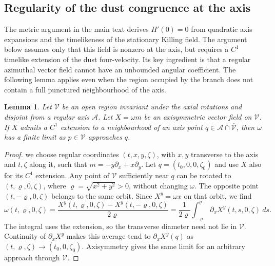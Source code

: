\documentclass[amsmath,amsfonts,amssymb,aps,pra,superscriptaddress,10pt]{revtex4-2}
\numberwithin{equation}{section}
\theoremstyle{plain}
\newtheorem{lemma}{Lemma}
\theoremstyle{definition}
\theoremstyle{remark}
\theoremstyle{definition}
\begin{document}
\subsection{Regularity of the dust congruence at the axis}

The metric argument in the main text derives $H'(0)=0$ from quadratic axis expansions and the timelikeness of the stationary Killing field. The argument below assumes only that this field is nonzero at the axis, but requires a $C^1$ timelike extension of the dust four-velocity. Its key ingredient is that a regular azimuthal vector field cannot have an unbounded angular coefficient. The following lemma applies even when the region occupied by the branch does not contain a full punctured neighbourhood of the axis.

\begin{lemma}\label{Smoothazcoeff}
Let $\mathcal{V}$ be an open region invariant under the axial rotations and disjoint from a regular axis $\mathcal{A}$. Let $X=\omega m$ be an axisymmetric vector field on $\mathcal{V}$. If $X$ admits a $C^1$ extension to a neighbourhood of an axis point $q\in\mathcal{A}\cap\overline{\mathcal{V}}$, then $\omega$ has a finite limit as $p\in\mathcal{V}$ approaches $q$.
\end{lemma}

\begin{proof}
we choose regular coordinates $(t,x,y,\zeta)$, with $x,y$ transverse to the axis and $t,\zeta$ along it, such that $m=-y\partial_x+x\partial_y$. Let $q=(t_0,0,0,\zeta_0)$ and use $X$ also for its $C^1$ extension. Any point of $\mathcal{V}$ sufficiently near $q$ can be rotated to $(t,\varrho,0,\zeta)$, where $\varrho=\sqrt{x^2+y^2}>0$, without changing $\omega$. The opposite point $(t,-\varrho,0,\zeta)$ belongs to the same orbit. Since $X^y=\omega x$ on that orbit, we find
\begin{equation}
\omega(t,\varrho,0,\zeta)=\frac{X^y(t,\varrho,0,\zeta)-X^y(t,-\varrho,0,\zeta)}{2\varrho}=\frac{1}{2\varrho}\int_{-\varrho}^{\varrho}
\partial_x X^y(t,s,0,\zeta)~ds.
\end{equation}
The integral uses the extension, so the transverse diameter need not lie in $\mathcal{V}$. Continuity of $\partial_x X^y$ makes this average tend to $\partial_x X^y(q)$ as $(t,\varrho,\zeta)\to(t_0,0,\zeta_0)$. Axisymmetry gives the same limit for an arbitrary approach through $\mathcal{V}$.
\end{proof}
\end{document}
